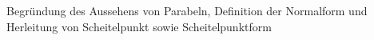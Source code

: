 \documentclass[../../main.tex]{subfiles}
\begin{document}
    Begründung des Aussehens von Parabeln, Definition der Normalform und Herleitung von Scheitelpunkt sowie Scheitelpunktform
\end{document}
